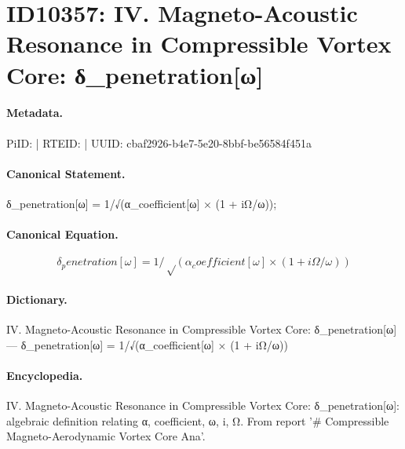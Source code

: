 \section*{ID10357: IV. Magneto-Acoustic Resonance in Compressible Vortex Core: δ\_penetration[ω]}
\paragraph{Metadata.}
PiID:  | RTEID:  | UUID: cbaf2926-b4e7-5e20-8bbf-be56584f451a

\paragraph{Canonical Statement.}
δ\_penetration[ω] = 1/√(α\_coefficient[ω] × (1 + iΩ/ω));

\paragraph{Canonical Equation.}
\[
δ_penetration[ω] = 1/√(α_coefficient[ω] × (1 + iΩ/ω))
\]

\paragraph{Dictionary.}
IV. Magneto-Acoustic Resonance in Compressible Vortex Core: δ\_penetration[ω] — δ\_penetration[ω] = 1/√(α\_coefficient[ω] × (1 + iΩ/ω))

\paragraph{Encyclopedia.}
IV. Magneto-Acoustic Resonance in Compressible Vortex Core: δ\_penetration[ω]: algebraic definition relating α, coefficient, ω, i, Ω. From report '\# Compressible Magneto-Aerodynamic Vortex Core Ana'.
